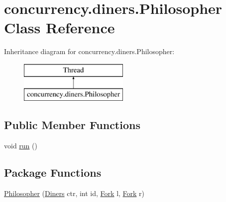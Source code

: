 \hypertarget{classconcurrency_1_1diners_1_1_philosopher}{}\section{concurrency.\+diners.\+Philosopher Class Reference}
\label{classconcurrency_1_1diners_1_1_philosopher}
Inheritance diagram for concurrency.\+diners.\+Philosopher\+:\begin{figure}[H]
\begin{center}
\leavevmode
\includegraphics[height=2.000000cm]{classconcurrency_1_1diners_1_1_philosopher}
\end{center}
\end{figure}
\subsection*{Public Member Functions}
\begin{DoxyCompactItemize}
\item 
void \mbox{\hyperlink{classconcurrency_1_1diners_1_1_philosopher_a7c998b2c972341a5d6afd8f35e55a749}{run}} ()
\end{DoxyCompactItemize}
\subsection*{Package Functions}
\begin{DoxyCompactItemize}
\item 
\mbox{\hyperlink{classconcurrency_1_1diners_1_1_philosopher_a79f885d27cffb8c3bf00ecd084fe5357}{Philosopher}} (\mbox{\hyperlink{classconcurrency_1_1diners_1_1_diners}{Diners}} ctr, int id, \mbox{\hyperlink{classconcurrency_1_1diners_1_1_fork}{Fork}} l, \mbox{\hyperlink{classconcurrency_1_1diners_1_1_fork}{Fork}} r)
\end{DoxyCompactItemize}

